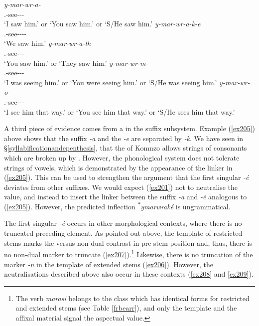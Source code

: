 \begin{exe}
\ex
\begin{xlist}
	\ex
	\gll \emph{y-mar-wr-a-\Zero{}}\\
	\Tsg.\Masc-see-\Ndu-\Pst-\Sg\\
	\trans `I saw him.' or `You saw him.' or `S/He saw him.'
	\label{ex201}
	\ex
	\gll \emph{y-mar-wr-a-k-e}\\
	\Tsg.\Masc-see-\Ndu-\Pst-\Lk-\Fnsg\\
	\trans `We saw him.'
	\label{ex205}
	\ex
	\gll \emph{y-mar-wr-a-th}\\
	\Tsg.\Masc-see-\Ndu-\Pst-\Stnsg\\
	\trans `You saw him.' or `They saw him.'
	\label{ex203}
	\ex
	\gll \emph{y-mar-wr-m-\Zero{}}\\
	\Tsg.\Masc-see-\Ndu-\Dur-\Sg\\
	\trans `I was seeing him.' or `You were seeing him.' or `S/He was seeing him.'
	\label{ex202}
	\ex
	\gll \emph{y-mar-wr-o-\Zero{}}\\
	\Tsg.\Masc-see-\Ndu-\Andat-\Sg\\
	\trans `I see him that way.' or `You see him that way.' or `S/He sees him that way.'
	\label{ex214}
\end{xlist}
\end{exe}

A third piece of evidence comes from a  in the suffix subsystem. Example (\ref{ex205}) above shows that the  suffix \emph{-a} and the \Fnsg{} \emph{-e} are separated by \emph{-k}. We have seen in \S{}\ref{syllabificationandepenthesis}, that the  of Komnzo allows strings of consonants which are broken up by . However, the phonological system does not tolerate strings of vowels, which is demonstrated by the appearance of the linker in (\ref{ex205}). This can be used to strengthen the argument that the first singular \emph{-é} deviates from other suffixes. We would expect (\ref{ex201}) not to neutralise the  value, and instead to insert the linker between the  suffix \emph{-a} and \emph{-é} analogous to (\ref{ex205}). However, the predicted inflection \textsuperscript{$\ast$}\emph{ymarwraké} is ungrammatical.%

The first singular \emph{-é} occurs in other morphological contexts, where there is no truncated preceding element. As pointed out above, the template of restricted stems marks the  versus non-dual contrast in pre-stem position and, thus, there is no non-dual marker to truncate (\ref{ex207}).\footnote{The verb \emph{marasi} belongs to the class which has identical forms for restricted and extended stems (see Table \ref{frbearr}), and only the template and the affixal material signal the aspectual value.} Likewise, there is no truncation of the  marker \emph{-n} in the template of extended stems (\ref{ex206}). However, the  neutralisations described above also occur in these contexts (\ref{ex208} and \ref{ex209}).

